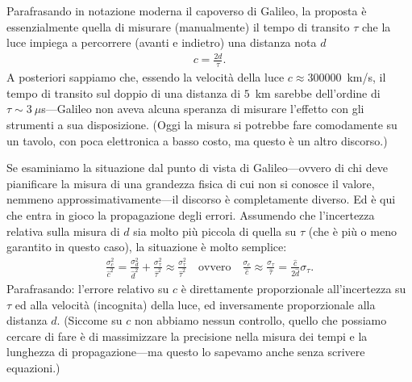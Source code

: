 Parafrasando in notazione moderna il capoverso di Galileo, la proposta è
essenzialmente quella di misurare (manualmente) il tempo di transito $\tau$
che la luce impiega a percorrere (avanti e indietro) una distanza nota $d$
\begin{align*}
  c = \frac{2d}{\tau}.
\end{align*}
A posteriori sappiamo che, essendo la velocità della luce $c \approx 300000$~km/s,
il tempo di transito sul doppio di una distanza di $5$~km sarebbe dell'ordine di
$\tau \sim 3~\mu$s---Galileo non aveva alcuna speranza di misurare l'effetto con
gli strumenti a sua disposizione. (Oggi la misura si potrebbe fare comodamente
su un tavolo, con poca elettronica a basso costo, ma questo è un altro discorso.)

Se esaminiamo la situazione dal punto di vista di Galileo---ovvero di chi
deve pianificare la misura di una grandezza fisica di cui non si conosce il valore,
nemmeno approssimativamente---il discorso è completamente diverso. Ed è qui che
entra in gioco la propagazione degli errori. Assumendo che l'incertezza relativa
sulla misura di $d$ sia molto più piccola di quella su $\tau$ (che è più o
meno garantito in questo caso), la situazione è molto semplice:
\begin{align}\label{eq:c_err}
  \frac{\sigma^2_c}{\hat{c}^2} =
  \frac{\sigma^2_d}{\hat{d}^2} + \frac{\sigma^2_\tau}{\hat{\tau}^2}
  \approx \frac{\sigma^2_\tau}{\hat{\tau}^2} \quad \text{ovvero} \quad
  \frac{\sigma_c}{\hat{c}} \approx \frac{\sigma_\tau}{\hat{\tau}} =
  \frac{\hat{c}}{2\hat{d}} \sigma_\tau.
\end{align}
Parafrasando: l'errore relativo su $c$ è direttamente proporzionale all'incertezza
su $\tau$ ed alla velocità (incognita) della luce, ed inversamente proporzionale
alla distanza $d$. (Siccome su $c$ non abbiamo nessun controllo, quello che
possiamo cercare di fare è di massimizzare la precisione nella misura dei tempi
e la lunghezza di propagazione---ma questo lo sapevamo anche senza scrivere
equazioni.)


